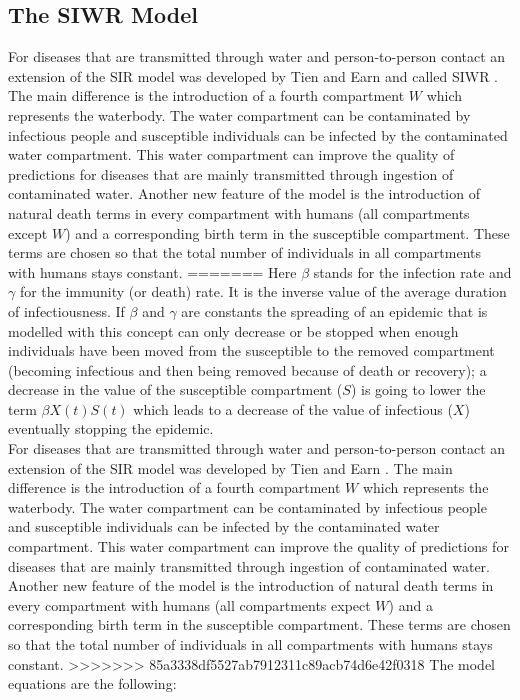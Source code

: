 \documentclass[11pt]{article}
\begin{document}
\subsection{The SIWR Model}
For diseases that are transmitted through water and person-to-person contact an extension of the SIR model was developed by Tien and Earn and called SIWR \cite{tien:2010}. The main difference is the introduction of a fourth compartment $ W $ which represents the waterbody. The water compartment can be contaminated by infectious people and susceptible individuals can be infected by the contaminated water compartment. This water compartment can improve the quality of predictions for diseases that are mainly transmitted through ingestion of contaminated water. Another new feature of the model is the introduction of natural death terms in every compartment with humans (all compartments except $ W $) and a corresponding birth term in the susceptible compartment. These terms are chosen so that the total number of individuals in all compartments with humans stays constant.
=======
Here $\beta$ stands for the infection rate and $\gamma$ for the immunity (or death) rate. It is the inverse value of the average duration of infectiousness. If $\beta$ and $\gamma$ are constants the spreading of an epidemic that is modelled with this concept can only decrease or be stopped when enough individuals have been moved from the susceptible to the removed compartment (becoming infectious and then being removed because of death or recovery); a decrease in the value of the susceptible compartment ($ S $) is going to lower the term $\beta X(t)S(t)$ which leads to a decrease of the value of infectious ($ X $) eventually stopping the epidemic.\\
For diseases that are transmitted through water and person-to-person contact an extension of the SIR model was developed by Tien and Earn \cite{tien:2010}. The main difference is the introduction of a fourth compartment $ W $ which represents the waterbody. The water compartment can be contaminated by infectious people and susceptible individuals can be infected by the contaminated water compartment. This water compartment can improve the quality of predictions for diseases that are mainly transmitted through ingestion of contaminated water. Another new feature of the model is the introduction of natural death terms in every compartment with humans (all compartments expect $ W $) and a corresponding birth term in the susceptible compartment. These terms are chosen so that the total number of individuals in all compartments with humans stays constant.
>>>>>>> 85a3338df5527ab7912311c89acb74d6e42f0318
The model equations are the following:
\end{document}
